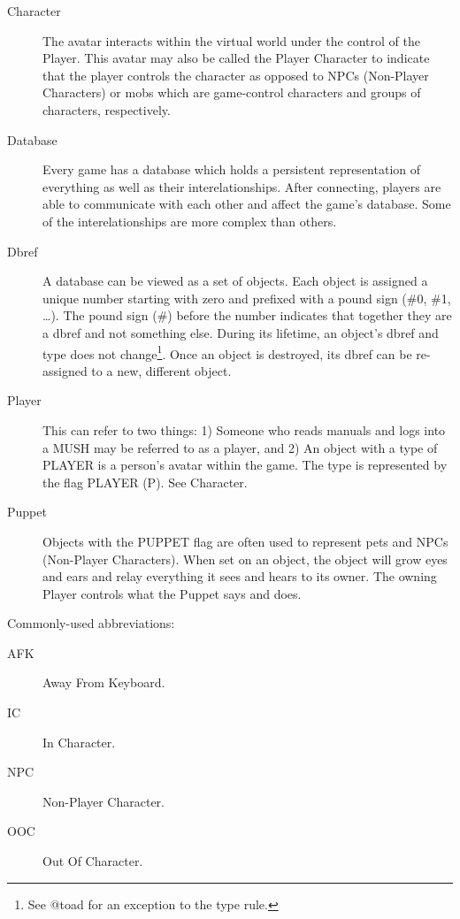 \documentclass[10pt,letterpaper]{book}
\begin{document}
\begin{description}
\item[Character]
The avatar interacts within the virtual world under the
control of the Player.
This avatar may also be called the Player Character to indicate that the
player controls the character as opposed to NPCs (Non-Player Characters) or
mobs which are game-control characters and groups of characters, respectively.

\item[Database]
Every game has a database which holds a persistent representation of
everything as well as their interelationships.
After connecting, players are able to communicate with each other and affect
the game's database.
Some of the interelationships are more complex than others.

\item[Dbref]
A database can be viewed as a set of objects.
Each object is assigned a unique number starting with zero and prefixed with
a pound sign (\#0, \#1, \ldots).
The pound sign (\#) before the number indicates that together they are a dbref
and not something else.
During its lifetime, an object's dbref and type does not change\footnote{See @toad
for an exception to the type rule.}.
Once an object is destroyed, its dbref can be re-assigned to a new,
different object.

\item[Player]
This can refer to two things: 1) Someone who reads manuals and
logs into a MUSH may be referred to as a player, and 2) An object with a type of
PLAYER is a person's avatar within the game.
The type is represented by the flag PLAYER (P).
See Character.

\item[Puppet]
Objects with the PUPPET flag are often used to represent pets and NPCs
(Non-Player Characters).
When set on an object, the object will grow eyes and ears and relay everything
it sees and hears to its owner. The owning Player controls what the Puppet
says and does.

\end{description}

Commonly-used abbreviations:

\begin{description}
\item[AFK] Away From Keyboard.

\item[IC] In Character.

\item[NPC] Non-Player Character.

\item[OOC] Out Of Character.

\end{description}
\end{document}
